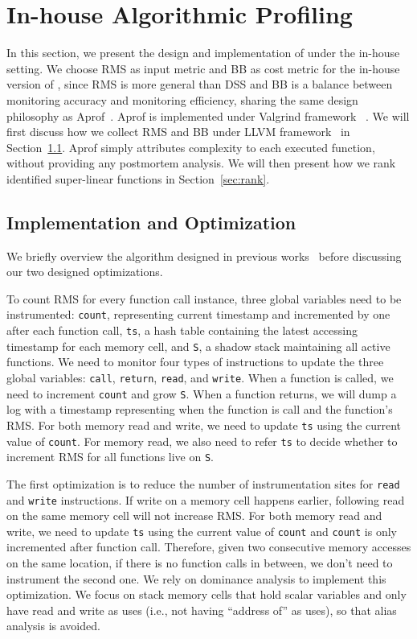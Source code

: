 \section{In-house Algorithmic Profiling}
\label{sec:in-house}

In this section, we present the design and implementation 
of \Tool under the in-house setting. 
We choose RMS as input metric and BB as cost 
metric for the in-house version of \Tool, 
since RMS is more general than DSS and BB is a balance 
between monitoring accuracy and monitoring efficiency, 
sharing the same design philosophy as Aprof~\cite{Aprof1,Aprof2}.
Aprof is implemented under Valgrind framework~\cite{valgrind} .
We will first discuss how we collect RMS and BB under LLVM 
framework~\cite{llvm} in Section~\ref{sec:inhouse_impl}.
Aprof simply attributes complexity to each executed function, 
without providing any postmortem analysis. 
We will then present how we rank identified super-linear 
functions in Section~\ref{sec:rank}. 


\subsection{Implementation and Optimization}
\label{sec:inhouse_impl}

We briefly overview the algorithm 
designed in previous works~\cite{Aprof1,Aprof2} 
before discussing our two designed optimizations. 

To count RMS for every function call instance, 
three global variables need to be instrumented:
\texttt{count}, representing current timestamp 
and incremented by one after each function call,
\texttt{ts}, a hash table containing the latest accessing timestamp 
for each memory cell,
and \texttt{S}, a shadow stack maintaining all active functions. 
We need to monitor four types of instructions to 
update the three global variables:
\texttt{call}, \texttt{return}, \texttt{read}, and \texttt{write}.
When a function is called, 
we need to increment \texttt{count} and grow \texttt{S}.
When a function returns, 
we will dump a log with a timestamp 
representing when the function is call 
and the function’s RMS.
For both memory read and write, we need to update \texttt{ts} 
using the current value of \texttt{count}. 
For memory read, we also need to refer \texttt{ts} to decide 
whether to increment RMS for all functions live on \texttt{S}.


The first optimization is to reduce the number of 
instrumentation sites for \texttt{read} and \texttt{write} instructions. 
If write on a memory cell happens earlier, 
following read on the same memory cell will not increase RMS.
For both memory read and write, 
we need to update \texttt{ts} using the current 
value of \texttt{count} and \texttt{count} is only incremented after function call. 
Therefore, given two consecutive memory accesses on the same location,
if there is no function calls in between, 
we don't need to instrument the second one. 
We rely on dominance analysis to implement this optimization. 
We focus on stack memory cells that hold scalar variables 
and only have read and write as uses 
(i.e., not having ``address of'' as uses), 
so that alias analysis is avoided. 

